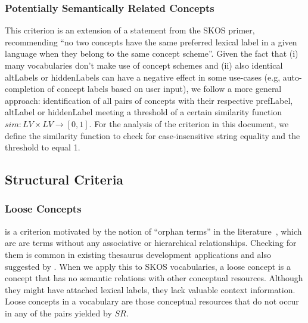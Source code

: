 \subsubsection{Potentially Semantically Related Concepts} 
This criterion is an extension of a statement from the SKOS primer, recommending ``no two concepts have the same preferred lexical label in a given language when they belong to the same concept scheme''. Given the fact that (i) many vocabularies don’t make use of concept schemes and (ii) also identical altLabels or hiddenLabels can have a negative effect in some use-cases (e.g, auto-completion of concept labels based on user input), we follow a more general approach: identification of all pairs of concepts with their respective prefLabel, altLabel or hiddenLabel meeting a threshold of a certain similarity function $sim:LV \times LV \rightarrow [0,1]$. For the analysis of the criterion in this document, we define the similarity function  to check for case-insensitive string equality and the threshold to equal 1.


\subsection{Structural Criteria}


\subsubsection{Loose Concepts} is a criterion motivated by the notion of ``orphan terms'' in the literature~\cite{Hedden2010}, which are are terms without any associative or hierarchical relationships. Checking for them is common in existing thesaurus development applications and also suggested by \cite{Z39.19:2005}. When we apply this to SKOS vocabularies, a loose concept is a concept that has no semantic relations with other conceptual resources. Although they might have attached lexical labels, they lack valuable context information. Loose concepts in a vocabulary are those conceptual resources that do not occur in any of the pairs yielded by $SR$.


